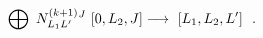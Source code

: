 \begin{equation}\label{mmAflowIII}
\bigoplus_{} \ N^{(k+1)}_{L_{1}L' }{}^{J} \ [0,L_{2},J]
\longrightarrow \ \makebox[5cm][l]{$\displaystyle [L_{1},L_{2},L'] \ \
.$}
\end{equation}

